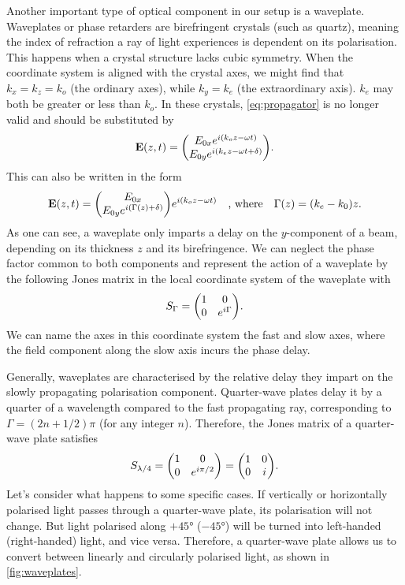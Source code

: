 Another important type of optical component in our setup is a waveplate. Waveplates or phase retarders are birefringent crystals (such as quartz), meaning the index of refraction a ray of light experiences is dependent on its polarisation. This happens when a crystal structure lacks cubic symmetry. When the coordinate system is aligned with the crystal axes, we might find that $ k_x = k_z = k_o $ (the ordinary axes), while $ k_y = k_e $ (the extraordinary axis). $ k_e $ may both be greater or less than $ k_o $. In these crystals, \autoref{eq:propagator} is no longer valid and should be substituted by
\begin{equation}
	\vb{E}(z, t) = \mqty(\Eox e^{i(k_o z-\omega t)} \\ \Eoy e^{i(k_e z-\omega t + \delta)} ).
\end{equation}
This can also be written in the form
\begin{equation}
	\vb{E}(z, t) = \mqty(\Eox  \\ \Eoy e^{i(\Gamma(z) + \delta)} ) e^{i(k_o z-\omega t)}
	\qq{, where}
	\Gamma(z) = (k_e-k_0) z.
\end{equation}
As one can see, a waveplate only imparts a delay on the $ y $-component of a beam, depending on its thickness $ z $ and its birefringence. We can neglect the phase factor common to both components and represent the action of a waveplate by the following Jones matrix in the local coordinate system of the waveplate with
\begin{equation}
	S_\Gamma = \mqty(1 & 0 \\ 0 & e^{i\Gamma}).
\end{equation}
We can name the axes in this coordinate system the fast and slow axes, where the field component along the slow axis incurs the phase delay.

Generally, waveplates are characterised by the relative delay they impart on the slowly propagating polarisation component. Quarter-wave plates delay it by a quarter of a wavelength compared to the fast propagating ray, corresponding to $ \Gamma = (2n + 1/2)\pi $ (for any integer $ n $). Therefore, the Jones matrix of a quarter-wave plate satisfies 
\begin{equation}
	S_\qwp = \mqty(1 & 0 \\ 0 & e^{i\pi/2}) = \mqty(1 & 0 \\ 0 & i).
\end{equation}
Let's consider what happens to some specific cases. If vertically or horizontally polarised light passes through a quarter-wave plate, its polarisation will not change. But light polarised along $ +\ang{45} $ ($ -\ang{45} $) will be turned into left-handed (right-handed) light, and vice versa. Therefore, a quarter-wave plate allows us to convert between linearly and circularly polarised light, as shown in \autoref{fig:waveplates}.

